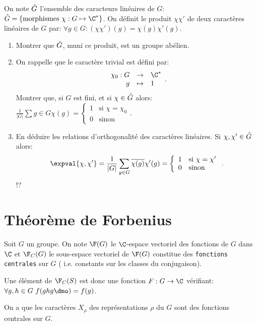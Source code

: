 \begin{exercise}
	On note $\Hat G$ l'ensemble des caracteurs linéaires de $G$: $\Hat G=\{\text{morphismes }\chi:G\mapsto \C^*\}$. On définit le produit $\chi\chi'$ de deux caractères linéaires de $G$ par: $\forall g \in G: (\chi\chi')(g)=\chi(g)\chi'(g)$.

	\begin{enumerate}
		\item Montrer que $\Hat G$, muni ce produit, est un groupe abélien.
		\item On rappelle que le caractère trivial est défini par: $$\begin{array}{rcl}\chi_0:G &\rightarrow& \C^\ast\\ g&\mapsto& 1\end{array}.$$
		Montrer que, si $G$ est fini, et si $\chi \in\Hat G$ alors:
		$\frac 1{|G|}\sum g\in G\chi(g)=\left\{\begin{array}{cl} 1 & \text{si $\chi=\chi_0$} \\ 0 & \text{sinon}\end{array}\right. $.
		\item En déduire les relations d'orthogonalité des caractères linéaires. Si $\chi,\chi'\in\Hat G$ alors:
		$$\expval{\chi,\chi'}=\frac 1{|G|}\sum_{g\in G}\overline{\chi(g)}\chi'(g)=\left\{ \begin{array}{cl}1&\text{si $\chi=\chi'$}\\0&\text{sinon}\end{array}\right..$$!?
	\end{enumerate}
\end{exercise}

\section{Théorème de Forbenius}

Soit $G$ un groupe.
On note $\F(G)$ le $\C$-espace vectoriel des fonctions de $G$ dans $\C$ et $\F_C(G)$ le sous-espace vectoriel de $\F(G)$ constitue des \texttt{fonctions centrales} sur $G$ ( i.e. constants sur les classes du conjugaison).

Une élément de $\F_C(S)$ est donc une fonction $F:G\rightarrow\C$ vérifiant: $\forall g,h\in G\ f(ghg\dmo)=f(g)$.

\begin{remark}	
	On a que les caractères $X_ρ$ des représentations $ρ$ du $G$ sont des fonctions centrales sur $G$.
\end{remark}

